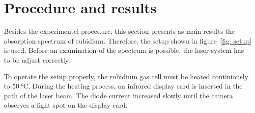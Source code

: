 \section{Procedure and results}\label{sec: procedure}
Besides the experimentel procedure, this section presents as main results the
absorption spectrum of rubidium. Therefore, the setup shown in figure~\ref{fig: setup}
is used. Before an examination of the spectrum is possible, the laser system has to be
adjust correctly.

To operate the setup properly, the rubidium gas cell must be heated
continiously to $\SI{50}{\degreeCelsius}$. During the heating process, an infrared display
card is inserted in the path of the laser beam.
The diode current increased slowly until the camera observes a light spot on the
display card.

